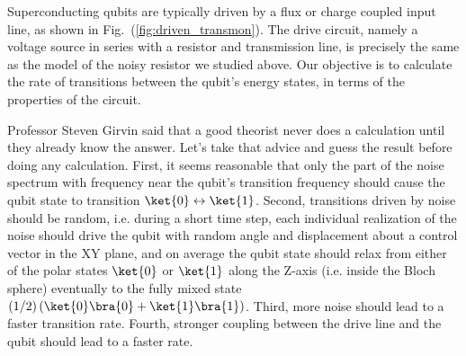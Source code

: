 
Superconducting qubits are typically driven by a flux or charge coupled input line, as shown in Fig.~(\ref{fig:driven_transmon}).
The drive circuit, namely a voltage source in series with a resistor and transmission line, is precisely the same as the model of the noisy resistor we studied above.
Our objective is to calculate the rate of transitions between the qubit's energy states, in terms of the properties of the circuit.


Professor Steven Girvin said that a good theorist never does a calculation until they already know the answer.
Let's take that advice and guess the result before doing any calculation.
First, it seems reasonable that only the part of the noise spectrum with frequency near the qubit's transition frequency should cause the qubit state to transition $\ket{0} \leftrightarrow \ket{1}$.
Second, transitions driven by noise should be random, i.e. during a short time step, each individual realization of the noise should drive the qubit with random angle and displacement about a control vector in the XY plane, and on average the qubit state should relax from either of the polar states $\ket{0}$ or $\ket{1}$ along the Z-axis (i.e. inside the Bloch sphere) eventually to the fully mixed state $(1/2)\left(\ket{0} \bra{0} + \ket{1} \bra{1} \right)$.
Third, more noise should lead to a faster transition rate.
Fourth, stronger coupling between the drive line and the qubit should lead to a faster rate.


